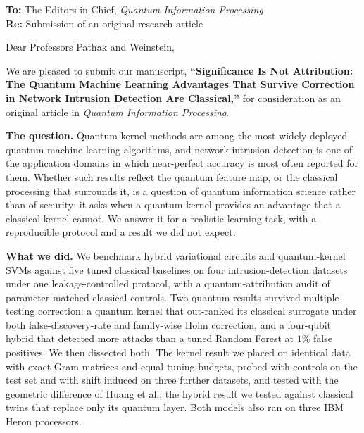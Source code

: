 \documentclass[11pt,a4paper]{article}
\begin{document}
\textbf{To:} The Editors-in-Chief, \emph{Quantum Information Processing}\\
\textbf{Re:} Submission of an original research article

\bigskip
Dear Professors Pathak and Weinstein,

We are pleased to submit our manuscript, \textbf{``Significance Is Not Attribution: The Quantum
Machine Learning Advantages That Survive Correction in Network Intrusion Detection Are Classical,''} for consideration as an original article in \emph{Quantum
Information Processing}.

\textbf{The question.} Quantum kernel methods are among the most widely deployed quantum machine
learning algorithms, and network intrusion detection is one of the application domains in which
near-perfect accuracy is most often reported for them. Whether such results reflect the quantum
feature map, or the classical processing that surrounds it, is a question of quantum information
science rather than of security: it asks when a quantum kernel provides an advantage that a classical
kernel cannot. We answer it for a realistic learning task, with a reproducible protocol and a result we
did not expect.

\textbf{What we did.} We benchmark hybrid variational circuits and quantum-kernel SVMs against five
tuned classical baselines on four intrusion-detection datasets under one leakage-controlled protocol,
with a quantum-attribution audit of parameter-matched classical controls. Two quantum results survived
multiple-testing correction: a quantum kernel that out-ranked its classical surrogate under both
false-discovery-rate and family-wise Holm correction, and a four-qubit hybrid that detected more attacks
than a tuned Random Forest at $1\%$ false positives. We then dissected both. The kernel result we placed
on identical data with exact Gram matrices and equal tuning budgets, probed with controls on the test set
and with shift induced on three further datasets, and tested with the geometric difference of Huang et
al.; the hybrid result we tested against classical twins that replace only its quantum layer. Both
models also ran on three IBM Heron processors.
\end{document}
